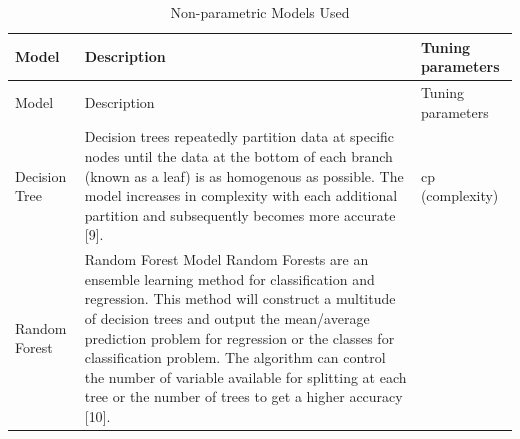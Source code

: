 \documentclass[11pt,]{article}
\begin{document}
\begin{longtable}[]{@{}lll@{}}
\caption{Non-parametric Models Used}\tabularnewline
\toprule
\begin{minipage}[b]{0.08\columnwidth}\raggedright
Model\strut
\end{minipage} & \begin{minipage}[b]{0.63\columnwidth}\raggedright
Description\strut
\end{minipage} & \begin{minipage}[b]{0.21\columnwidth}\raggedright
Tuning parameters\strut
\end{minipage}\tabularnewline
\midrule
\endfirsthead
\toprule
\begin{minipage}[b]{0.08\columnwidth}\raggedright
Model\strut
\end{minipage} & \begin{minipage}[b]{0.63\columnwidth}\raggedright
Description\strut
\end{minipage} & \begin{minipage}[b]{0.21\columnwidth}\raggedright
Tuning parameters\strut
\end{minipage}\tabularnewline
\midrule
\endhead
\begin{minipage}[t]{0.08\columnwidth}\raggedright
Decision Tree\strut
\end{minipage} & \begin{minipage}[t]{0.63\columnwidth}\raggedright
Decision trees repeatedly partition data at specific nodes until the
data at the bottom of each branch (known as a leaf) is as homogenous as
possible. The model increases in complexity with each additional
partition and subsequently becomes more accurate {[}9{]}.\strut
\end{minipage} & \begin{minipage}[t]{0.21\columnwidth}\raggedright
cp (complexity)\strut
\end{minipage}\tabularnewline
\begin{minipage}[t]{0.08\columnwidth}\raggedright
Random Forest\strut
\end{minipage} & \begin{minipage}[t]{0.63\columnwidth}\raggedright
Random Forest Model Random Forests are an ensemble learning method for
classification and regression. This method will construct a multitude of
decision trees and output the mean/average prediction problem for
regression or the classes for classification problem. The algorithm can
control the number of variable available for splitting at each tree or
the number of trees to get a higher accuracy {[}10{]}.\strut

\end{minipage}
\end{longtable}
\end{document}
